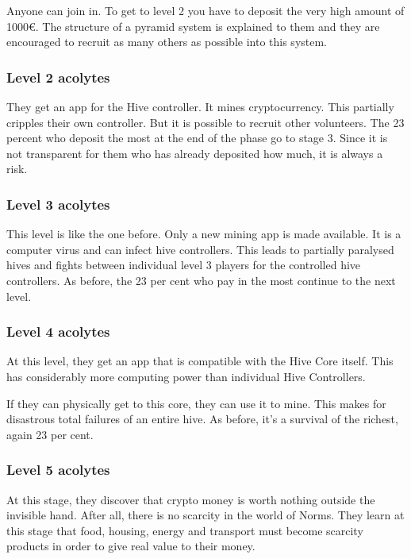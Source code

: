 Anyone can join in. To get to level 2 you have to deposit the very high amount of 1000€. The structure of a pyramid system is explained to them and they are encouraged to recruit as many others as possible into this system.

\subsubsection{Level 2 acolytes}

They get an app for the Hive controller. It mines cryptocurrency. This partially cripples their own controller. But it is possible to recruit other volunteers.
The 23 percent who deposit the most at the end of the phase go to stage 3. Since it is not transparent for them who has already deposited how much, it is always a risk.

\subsubsection{Level 3 acolytes}

This level is like the one before. Only a new mining app is made available. It is a computer virus and can infect hive controllers. This leads to partially paralysed hives and fights between individual level 3 players for the controlled hive controllers.
As before, the 23 per cent who pay in the most continue to the next level.

\subsubsection{Level 4 acolytes}

At this level, they get an app that is compatible with the Hive Core itself. This has considerably more computing power than individual Hive Controllers.

If they can physically get to this core, they can use it to mine. This makes for disastrous total failures of an entire hive.
As before, it's a survival of the richest, again 23 per cent.

\subsubsection{Level 5 acolytes}

At this stage, they discover that crypto money is worth nothing outside the invisible hand. After all, there is no scarcity in the world of Norms. They learn at this stage that food, housing, energy and transport must become scarcity products in order to give real value to their money.

